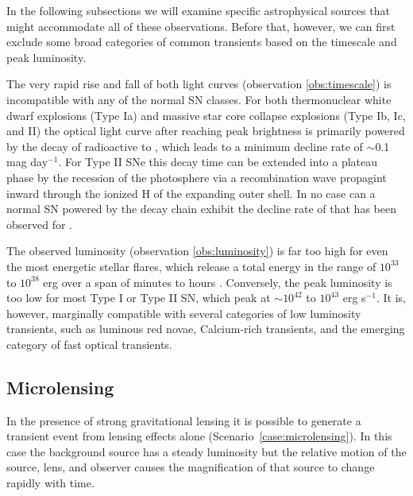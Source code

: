 \noindent In the following subsections we will examine specific
astrophysical sources that might accommodate all of these
observations. Before that, however, we can first exclude some broad
categories of common transients based on the timescale and peak
luminosity.

The very rapid rise and fall of both light curves (observation
\ref{obs:timescale}) is incompatible with any of the normal SN
classes.  For both thermonuclear white dwarf explosions (Type Ia) and
massive star core collapse explosions (Type Ib, Ic, and II) the
optical light curve after reaching peak brightness is primarily
powered by the decay of radioactive \NiFiftySix to \CoFiftySix, which
leads to a minimum decline rate of $\sim$0.1 mag day$^{-1}$.  For Type
II SNe this decay time can be extended into a plateau phase by the
recession of the photosphere via a recombination wave propagint inward
through the ionized H of the expanding outer shell.  In no case can a
normal SN powered by the \NiFiftySix decay chain exhibit the decline
rate of  that has been
observed for \spock.

The observed luminosity (observation \ref{obs:luminosity}) is far too
high for even the most energetic stellar flares, which release a total
energy in the range of $10^{33}$ to $10^{38}$ erg over a span of
minutes to hours \citep{Balona:2012,Karoff:2016}.  Conversely, the
peak luminosity is too low for most Type I or Type II SN, which peak
at $\sim10^{42}$ to $10^{43}$ erg s$^{-1}$.  It is, however, marginally
compatible with several categories of low luminosity transients, such
as luminous red novae, Calcium-rich transients, and the emerging
category of fast optical transients.








\subsection{Microlensing}

In the presence of strong gravitational lensing it is possible to
generate a transient event from lensing effects alone
(Scenario~\ref{case:microlensing}).  In this case the background
source has a steady luminosity but the relative motion of the source,
lens, and observer causes the magnification of that source to change
rapidly with time.

